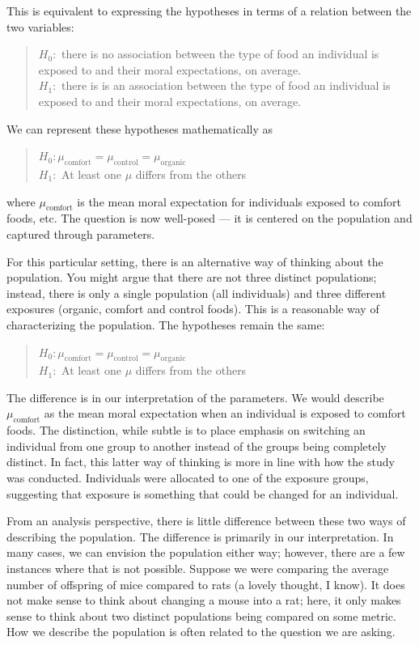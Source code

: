 \documentclass[]{book}
\theoremstyle{plain}
\theoremstyle{mydefn}
\theoremstyle{myexmpl}
\theoremstyle{remark}
\begin{document}
This is equivalent to expressing the hypotheses in terms of a relation
between the two variables:

\begin{quote}
\(H_0:\) there is no association between the type of food an individual
is exposed to and their moral expectations, on average.\\
\(H_1:\) there is is an association between the type of food an
individual is exposed to and their moral expectations, on average.
\end{quote}

We can represent these hypotheses mathematically as

\begin{quote}
\(H_0: \mu_{\text{comfort}} = \mu_{\text{control}} = \mu_{\text{organic}}\)\\
\(H_1:\) At least one \(\mu\) differs from the others
\end{quote}

where \(\mu_{\text{comfort}}\) is the mean moral expectation for
individuals exposed to comfort foods, etc. The question is now
well-posed --- it is centered on the population and captured through
parameters.

For this particular setting, there is an alternative way of thinking
about the population. You might argue that there are not three distinct
populations; instead, there is only a single population (all
individuals) and three different exposures (organic, comfort and control
foods). This is a reasonable way of characterizing the population. The
hypotheses remain the same:

\begin{quote}
\(H_0: \mu_{\text{comfort}} = \mu_{\text{control}} = \mu_{\text{organic}}\)\\
\(H_1:\) At least one \(\mu\) differs from the others
\end{quote}

The difference is in our interpretation of the parameters. We would
describe \(\mu_{\text{comfort}}\) as the mean moral expectation when an
individual is exposed to comfort foods. The distinction, while subtle is
to place emphasis on switching an individual from one group to another
instead of the groups being completely distinct. In fact, this latter
way of thinking is more in line with how the study was conducted.
Individuals were allocated to one of the exposure groups, suggesting
that exposure is something that could be changed for an individual.

From an analysis perspective, there is little difference between these
two ways of describing the population. The difference is primarily in
our interpretation. In many cases, we can envision the population either
way; however, there are a few instances where that is not possible.
Suppose we were comparing the average number of offspring of mice
compared to rats (a lovely thought, I know). It does not make sense to
think about changing a mouse into a rat; here, it only makes sense to
think about two distinct populations being compared on some metric. How
we describe the population is often related to the question we are
asking.
\end{document}
